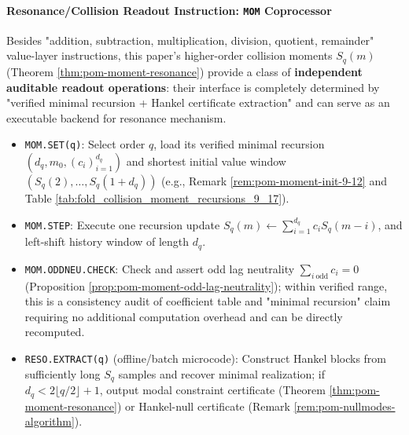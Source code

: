 \paragraph{Resonance/Collision Readout Instruction: \texttt{MOM} Coprocessor}
Besides "addition, subtraction, multiplication, division, quotient, remainder" value-layer instructions, this paper's higher-order collision moments \(S_q(m)\) (Theorem \ref{thm:pom-moment-resonance}) provide a class of \textbf{independent auditable readout operations}: their interface is completely determined by "verified minimal recursion + Hankel certificate extraction" and can serve as an executable backend for resonance mechanism.
\begin{itemize}
  \item \texttt{MOM.SET(q)}: Select order \(q\), load its verified minimal recursion \((d_q,m_0,(c_i)_{i=1}^{d_q})\) and shortest initial value window \((S_q(2),\dots,S_q(1+d_q))\) (e.g., Remark \ref{rem:pom-moment-init-9-12} and Table \ref{tab:fold_collision_moment_recursions_9_17}).
  \item \texttt{MOM.STEP}: Execute one recursion update
  \(
  S_q(m)\leftarrow \sum_{i=1}^{d_q} c_i S_q(m-i)
  \), and left-shift history window of length \(d_q\).
  \item \texttt{MOM.ODDNEU.CHECK}: Check and assert odd lag neutrality
  \(
  \sum_{i\ \mathrm{odd}} c_i=0
  \)
  (Proposition \ref{prop:pom-moment-odd-lag-neutrality}); within verified range, this is a consistency audit of coefficient table and "minimal recursion" claim requiring no additional computation overhead and can be directly recomputed.
  \item \texttt{RESO.EXTRACT(q)} (offline/batch microcode): Construct Hankel blocks from sufficiently long \(S_q\) samples and recover minimal realization; if \(d_q<2\lfloor q/2\rfloor+1\), output modal constraint certificate (Theorem \ref{thm:pom-moment-resonance}) or Hankel-null certificate (Remark \ref{rem:pom-nullmodes-algorithm}).
\end{itemize}

